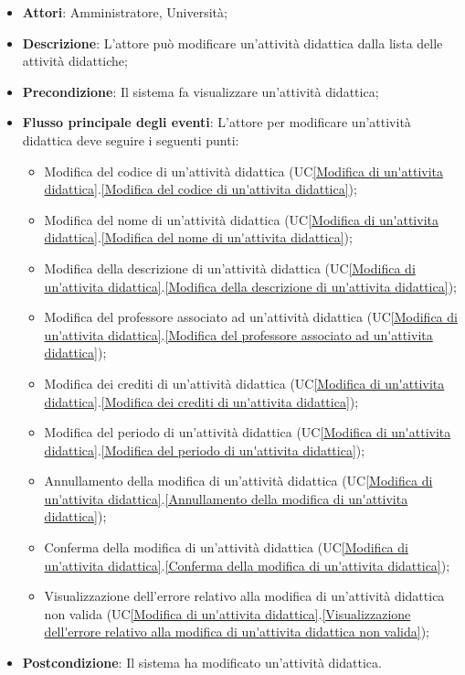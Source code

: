\begin{itemize}
	\item \textbf{Attori}: Amministratore, Università;
	\item \textbf{Descrizione}: L'attore può modificare un'attività didattica dalla lista delle attività didattiche;
	
	\item \textbf{Precondizione}: Il sistema fa visualizzare un'attività didattica;
	
	\item \textbf{Flusso principale degli eventi}: L'attore per modificare un'attività didattica deve seguire i seguenti punti:
	
	\begin{itemize}
		\item Modifica del codice di un'attività didattica (UC\ref{Modifica di un'attivita didattica}.\ref{Modifica del codice di un'attivita didattica});
		\item Modifica del nome di un'attività didattica (UC\ref{Modifica di un'attivita didattica}.\ref{Modifica del nome di un'attivita didattica});
		\item Modifica della descrizione di un'attività didattica (UC\ref{Modifica di un'attivita didattica}.\ref{Modifica della descrizione di un'attivita didattica});
		\item Modifica del professore associato ad un'attività didattica (UC\ref{Modifica di un'attivita didattica}.\ref{Modifica del professore associato ad un'attivita didattica});
		\item Modifica dei crediti di un'attività didattica (UC\ref{Modifica di un'attivita didattica}.\ref{Modifica dei crediti di un'attivita didattica});
		\item Modifica del periodo di un'attività didattica (UC\ref{Modifica di un'attivita didattica}.\ref{Modifica del periodo di un'attivita didattica});
		\item Annullamento della modifica di un'attività didattica (UC\ref{Modifica di un'attivita didattica}.\ref{Annullamento della modifica di un'attivita didattica});
		\item Conferma della modifica di un'attività didattica (UC\ref{Modifica di un'attivita didattica}.\ref{Conferma della modifica di un'attivita didattica});
		\item Visualizzazione dell'errore relativo alla modifica di un'attività didattica non valida (UC\ref{Modifica di un'attivita didattica}.\ref{Visualizzazione dell'errore relativo alla modifica di un'attivita didattica non valida});
	\end{itemize}
	\item \textbf{Postcondizione}: Il sistema ha modificato un'attività didattica.
	
\end{itemize}

